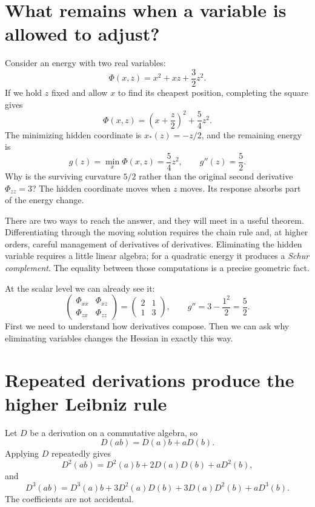 

\section{What remains when a variable is allowed to adjust?}

Consider an energy with two real variables:
\[
 \Phi(x,z)=x^2+xz+\frac32z^2.
\]
If we hold $z$ fixed and allow $x$ to find its cheapest position, completing the square gives
\[
 \Phi(x,z)=\left(x+\frac z2\right)^2+\frac54 z^2.
\]
The minimizing hidden coordinate is $x_*(z)=-z/2$, and the remaining energy is
\[
 g(z)=\min_x\Phi(x,z)=\frac54z^2,
 \qquad g''(z)=\frac52.
\]
Why is the surviving curvature $5/2$ rather than the original second derivative $\Phi_{zz}=3$? The hidden coordinate moves when $z$ moves. Its response absorbs part of the energy change.

There are two ways to reach the answer, and they will meet in a useful theorem. Differentiating through the moving solution requires the chain rule and, at higher orders, careful management of derivatives of derivatives. Eliminating the hidden variable requires a little linear algebra; for a quadratic energy it produces a \emph{Schur complement}. The equality between those computations is a precise geometric fact.

At the scalar level we can already see it:
\[
 \begin{pmatrix}\Phi_{xx}&\Phi_{xz}\\
                 \Phi_{zx}&\Phi_{zz}\end{pmatrix}
 =\begin{pmatrix}2&1\\1&3\end{pmatrix},
 \qquad
 \boxed{g''=3-\frac{1^2}{2}=\frac52.}
\]
First we need to understand how derivatives compose. Then we can ask why eliminating variables changes the Hessian in exactly this way.

\section{Repeated derivations produce the higher Leibniz rule}

Let \(D\) be a derivation on a commutative algebra, so
\[
  D(ab)=D(a)b+aD(b).
\]
Applying \(D\) repeatedly gives
\[
  D^2(ab)=D^2(a)b+2D(a)D(b)+aD^2(b),
\]
and
\[
  D^3(ab)
  =D^3(a)b+3D^2(a)D(b)+3D(a)D^2(b)+aD^3(b).
\]
The coefficients are not accidental.

